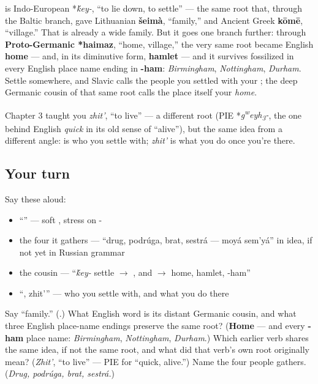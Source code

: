 \begin{cousinweb}
\textbf{} is Indo-European *\emph{\'{k}ey-}, \textquotedblleft{}to lie down, to settle\textquotedblright{} — the same root that, through the Baltic branch, gave Lithuanian \textbf{šeimà}, \textquotedblleft{}family,\textquotedblright{} and Ancient Greek \textbf{kōmē}, \textquotedblleft{}village.\textquotedblright{} That is already a wide family. But it goes one branch further: through \textbf{Proto-Germanic *haimaz}, \textquotedblleft{}home, village,\textquotedblright{} the very same root became English \textbf{home} — and, in its diminutive form, \textbf{hamlet} — and it survives fossilized in every English place name ending in \textbf{-ham}: \emph{Birmingham}, \emph{Nottingham}, \emph{Durham}. Settle somewhere, and Slavic calls the people you settled with your \emph{}; the deep Germanic cousin of that same root calls the place itself your \emph{home}.

Chapter 3 taught you \emph{zhit'}, \textquotedblleft{}to live\textquotedblright{} — a different root (PIE *\emph{g\textsuperscript{w}eyh\textsubscript{3}-}, the one behind English \emph{quick} in its old sense of \textquotedblleft{}alive\textquotedblright{}), but the same idea from a different angle: \textbf{} is who you settle with; \emph{zhit'} is what you do once you're there.
\end{cousinweb}

\subsection*{Your turn}
Say these aloud:

\begin{itemize}
\raggedright
  \item \textquotedblleft{}\textquotedblright{} — soft , stress on -
  \item the four it gathers — \textquotedblleft{}drug, podrúga, brat, sestrá — moyá sem'yá\textquotedblright{} in idea, if not yet in Russian grammar
  \item the cousin — \textquotedblleft{}\emph{\'{k}ey-} settle $\to$ , and $\to$ home, hamlet, -ham\textquotedblright{}
  \item \textquotedblleft{}, zhit'\textquotedblright{} — who you settle with, and what you do there
\end{itemize}

\begin{tcolorbox}[breakable,colback=teal!4,colframe=teal!35!black,title={Before you move on}]
Say \textquotedblleft{}family.\textquotedblright{} (\textbf{}.) What English word is its distant Germanic cousin, and what three English place-name endings preserve the same root? (\textbf{Home} — and every \textbf{-ham} place name: \emph{Birmingham}, \emph{Nottingham}, \emph{Durham}.) Which earlier verb shares the same idea, if not the same root, and what did that verb's own root originally mean? (\emph{Zhit'}, \textquotedblleft{}to live\textquotedblright{} — PIE for \textquotedblleft{}quick, alive.\textquotedblright{}) Name the four people \emph{} gathers. (\emph{Drug, podrúga, brat, sestrá.})
\end{tcolorbox}
